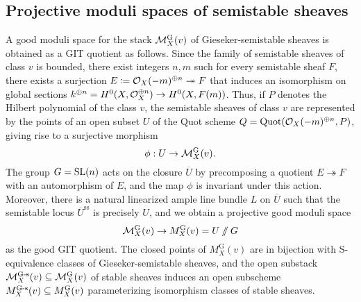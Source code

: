 \subsection{Projective moduli spaces of semistable sheaves}
A good moduli space for the stack $\mathcal{M}^{\text{G}}_X(v)$ of Gieseker-semistable sheaves is obtained as a GIT quotient as follows. Since the family of semistable sheaves of class $v$ is bounded, there exist integers $n, m$ such for every semistable sheaf $F$, there exists a surjection $E \coloneqq \mathcal{O}_X(-m)^{\oplus n} \twoheadrightarrow F$ that induces an isomorphism on global sections $k^{\oplus n} = H^0(X, \mathcal{O}_X^{\oplus n}) \to H^0(X, F(m))$. Thus, if $P$ denotes the Hilbert polynomial of the class $v$, the semistable sheaves of class $v$ are represented by the points of an open subset $U$ of the Quot scheme $Q = \mathrm{Quot}(\mathcal{O}_X(-m)^{\oplus n}, P)$, giving rise to a surjective morphism
\[ \phi: U \to \mathcal{M}^{\text{G}}_X(v). \]
The group $G = \mathrm{SL}(n)$ acts on the closure $\overline{U}$ by precomposing a quotient $E \twoheadrightarrow F$ with an automorphism of $E$, and the map $\phi$ is invariant under this action. Moreover, there is a natural linearized ample line bundle $L$ on $\overline{U}$ such that the semistable locus $\overline{U}^{\text{ss}}$ is precisely $U$, and we obtain a projective good moduli space 
\[ \mathcal{M}^{\text{G}}_X(v) \to M^{\text{G}}_X(v) = U\mathbin{/\mkern-6mu/} G \]
as the good GIT quotient. The closed points of $M^{\text{G}}_X(v)$ are in bijection with S-equivalence classes of Gieseker-semistable sheaves, and the open substack $\mathcal{M}^{\text{G-s}}_X(v) \subseteq \mathcal{M}^{\text{G}}_X(v)$ of stable sheaves induces an open subscheme $M^{\text{G-s}}_X(v) \subseteq M^{\text{G}}_X(v)$ parameterizing isomorphism classes of stable sheaves.

